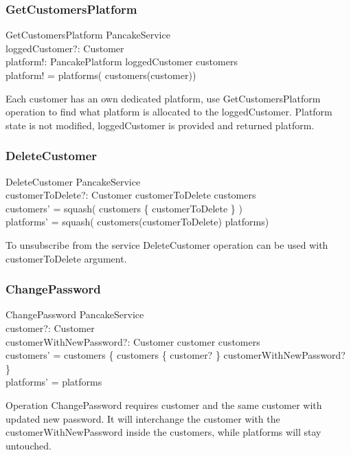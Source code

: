 \documentclass{article}
\begin{document}
\subsubsection{GetCustomersPlatform}
\begin{schema}{GetCustomersPlatform}
  \Xi PancakeService \\
  loggedCustomer?: Customer \\
  platform!: PancakePlatform
\where
  loggedCustomer \in customers \\
  
  platform! = platforms( customers\inv(customer))
\end{schema}
Each customer has an own dedicated platform, use GetCustomersPlatform operation to find what platform is allocated to the loggedCustomer. Platform state is not modified, loggedCustomer is provided and returned platform.



\label{toc:DeleteCustomer}
\subsubsection{DeleteCustomer}
\begin{schema}{DeleteCustomer}
  \Delta PancakeService \\
  customerToDelete?: Customer
\where
  customerToDelete \in customers \\
  customers' = squash( customers \nrres \{ customerToDelete \} )\\
  platforms' = squash(  customers\inv(customerToDelete) \ndres platforms) \\
\end{schema}
To unsubscribe from the service DeleteCustomer operation can be used with customerToDelete argument. 


\newpage
\label{toc:ChangePassword}
\subsubsection{ChangePassword}
\begin{schema}{ChangePassword}
  \Delta PancakeService \\
  customer?: Customer \\
  customerWithNewPassword?: Customer
\where
  customer \in customers \\  
  customers' = customers \oplus  \{ customers \inv \limg \{ customer? \} \rimg  \mapsto customerWithNewPassword? \}  \\
  platforms' = platforms 
\end{schema}
Operation ChangePassword requires customer and the same customer with updated new password. It will interchange the customer with the customerWithNewPassword inside the customers, while platforms will stay untouched.
\end{document}
